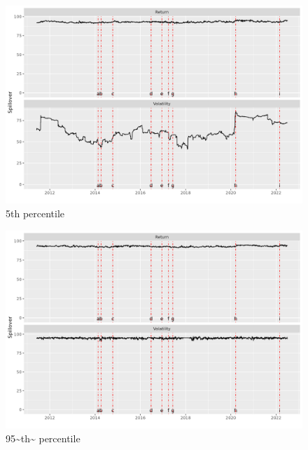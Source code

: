 \documentclass[
  letterpaper,
  DIV=11,
  numbers=noendperiod]{scrartcl}
\begin{document}
\begin{figure}[H]

{\centering \includegraphics{plots/fig-TCI5.png}

}

\caption{\label{fig-TCI5}5th percentile}

\end{figure}

\begin{figure}[H]

{\centering \includegraphics{plots/fig-TCI95.png}

}

\caption{\label{fig-TCI95}95\textasciitilde th\textasciitilde{}
percentile}

\end{figure}
\end{document}
